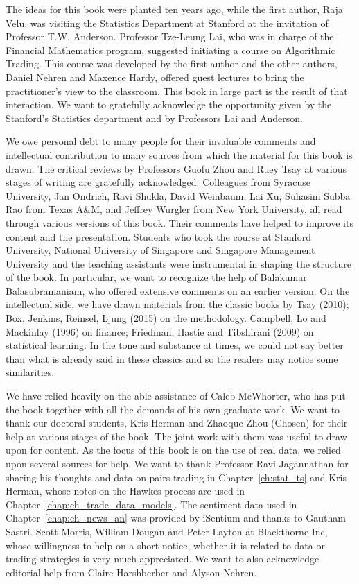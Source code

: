The ideas for this book were planted ten years ago, while the first author, Raja Velu, was visiting the Statistics Department at Stanford at the invitation of Professor T.W. Anderson. Professor Tze-Leung Lai, who was in charge of the Financial Mathematics program, suggested initiating a course on Algorithmic Trading. This course was developed by the first author and the other authors, Daniel Nehren and Maxence Hardy, offered guest lectures to bring the practitioner's view to the classroom. This book in large part is the result of that interaction. We want to gratefully acknowledge the opportunity given by the Stanford's Statistics department and by Professors Lai and Anderson. 


We owe personal debt to many people for their invaluable comments and intellectual contribution to many sources from which the material for this book is drawn. The critical reviews by Professors Guofu Zhou and Ruey Tsay at various stages of writing are gratefully acknowledged. Colleagues from Syracuse University, Jan Ondrich, Ravi Shukla, David Weinbaum, Lai Xu, Suhasini Subba Rao from Texas A\&M, and Jeffrey Wurgler from New York University, all read through various versions of this book. Their comments have helped to improve its content and the presentation. Students who took the course at Stanford University, National University of Singapore and Singapore Management University and the teaching assistants were instrumental in shaping the structure of the book. In particular, we want to recognize the help of Balakumar Balasubramaniam, who offered extensive comments on an earlier version. On the intellectual side, we have drawn materials from the classic books by Tsay (2010); Box, Jenkins, Reinsel, Ljung (2015) on the methodology. Campbell, Lo and Mackinlay (1996) on finance; Friedman, Hastie and Tibshirani (2009) on statistical learning. In the tone and substance at times, we could not say better than what is already said in these classics and so the readers may notice some similarities.


We have relied heavily on the able assistance of Caleb McWhorter, who has put the book together with all the demands of his own graduate work. We want to thank our doctoral students, Kris Herman and Zhaoque Zhou (Chosen) for their help at various stages of the book. The joint work with them was useful to draw upon for content. As the focus of this book is on the use of real data, we relied upon several sources for help. We want to thank Professor Ravi Jagannathan for sharing his thoughts and data on pairs trading in Chapter~\ref{ch:stat_ts} and Kris Herman, whose notes on the Hawkes process are used in Chapter~\ref{chap:ch_trade_data_models}. The sentiment data used in Chapter~\ref{chap:ch_news_an} was provided by iSentium and thanks to Gautham Sastri. Scott Morris, William Dougan and Peter Layton at Blackthorne Inc, whose willingness to help on a short notice, whether it is related to data or trading strategies is very much appreciated. We want to also acknowledge editorial help from Claire Harshberber and Alyson Nehren. 


